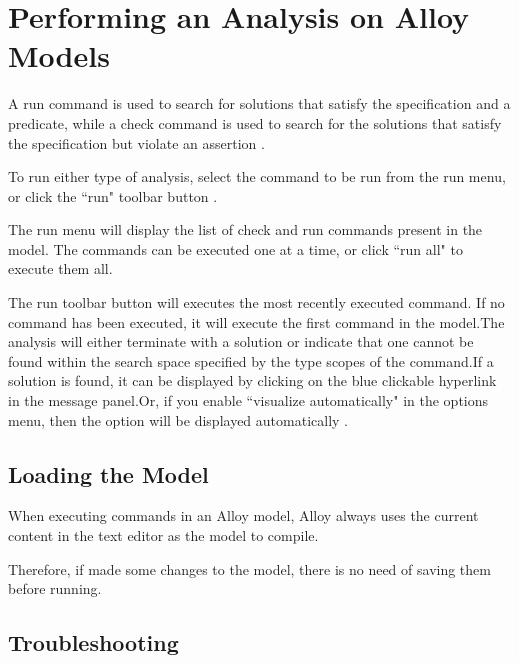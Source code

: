 \documentclass[a4paper,12pt]{report}
\begin{document}
\section{Performing an Analysis on Alloy Models}
\label{Alloy Performance}

A run command is used to search for solutions that satisfy the specification and a predicate, while a check command is used to search for the solutions that satisfy the specification but violate an assertion \cite{DanielJackson2004}.

To run either type of analysis, select the command to be run from the run menu, or click the ``run" toolbar button \cite{DanielJackson2004}.

The run menu will display the list of check and run commands present in the model. The commands can be executed one at a time, or click ``run all" to execute them all.

The run toolbar button will executes the most recently executed command. If no command has been executed, it will execute the first command in the model.The analysis will either terminate with a solution or indicate that one cannot be found within the search space specified by the type scopes of the command.If a solution is found, it can be displayed by clicking on the blue clickable hyperlink in the message panel.Or, if you enable ``visualize automatically" in the options menu, then the option will be displayed automatically \cite{DanielJackson2004}.

\subsection{Loading the Model}
\label{Model loading}

When executing commands in an Alloy model, Alloy always uses the current content in the text editor as the model to compile.

Therefore, if made some changes to the model, there is no need of saving them before running.

\subsection{Troubleshooting}
\label{Troubleshoot}
\end{document}
